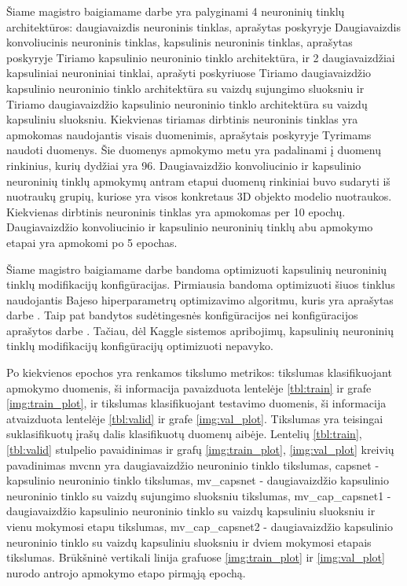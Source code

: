 
Šiame magistro baigiamame darbe yra palyginami 4 neuroninių tinklų architektūros: daugiavaizdis neuroninis tinklas, aprašytas poskyryje Daugiavaizdis konvoliucinis neuroninis tinklas, kapsulinis neuroninis tinklas, aprašytas poskyryje Tiriamo kapsulinio neuroninio tinklo architektūra, ir 2 daugiavaizdžiai kapsuliniai neuroniniai tinklai, aprašyti poskyriuose Tiriamo daugiavaizdžio kapsulinio neuroninio tinklo architektūra su vaizdų sujungimo sluoksniu ir Tiriamo daugiavaizdžio kapsulinio neuroninio tinklo architektūra su vaizdų kapsuliniu sluoksniu. Kiekvienas tiriamas dirbtinis neuroninis tinklas yra apmokomas naudojantis visais duomenimis, aprašytais poskyryje Tyrimams naudoti duomenys. Šie duomenys apmokymo metu yra padalinami į duomenų rinkinius, kurių dydžiai yra 96. Daugiavaizdžio konvoliucinio ir kapsulinio neuroninių tinklų apmokymų antram etapui duomenų rinkiniai buvo sudaryti iš nuotraukų grupių, kuriose yra visos konkretaus 3D objekto modelio nuotraukos. Kiekvienas dirbtinis neuroninis tinklas yra apmokomas per 10 epochų. Daugiavaizdžio konvoliucinio ir kapsulinio neuroninių tinklų abu apmokymo etapai yra apmokomi po 5 epochas.

Šiame magistro baigiamame darbe bandoma optimizuoti kapsulinių neuroninių tinklų modifikacijų konfigūracijas. Pirmiausia bandoma optimizuoti šiuos tinklus naudojantis Bajeso hiperparametrų optimizavimo algoritmu, kuris yra aprašytas darbe \cite{bayes}. Taip pat bandytos sudėtingesnės konfigūracijos nei konfigūracijos aprašytos darbe \cite{capsNet}. Tačiau, dėl Kaggle sistemos apribojimų, kapsulinių neuroninių tinklų modifikacijų konfigūracijų optimizuoti nepavyko.

Po kiekvienos epochos yra renkamos tikslumo metrikos: tikslumas klasifikuojant apmokymo duomenis, ši informacija pavaizduota lentelėje \ref{tbl:train} ir grafe \ref{img:train_plot}, ir tikslumas klasifikuojant testavimo duomenis, ši informacija atvaizduota lentelėje \ref{tbl:valid} ir grafe \ref{img:val_plot}. Tikslumas yra teisingai suklasifikuotų įrašų dalis klasifikuotų duomenų aibėje. Lentelių \ref{tbl:train}, \ref{tbl:valid} stulpelio pavaidinimas ir grafų \ref{img:train_plot}, \ref{img:val_plot} kreivių pavadinimas mvcnn yra daugiavaizdžio neuroninio tinklo tikslumas, capsnet - kapsulinio neuroninio tinklo tikslumas, mv\_capsnet - daugiavaizdžio kapsulinio neuroninio tinklo su vaizdų sujungimo sluoksniu tikslumas, mv\_cap\_capsnet1 - daugiavaizdžio kapsulinio neuroninio tinklo su vaizdų kapsuliniu sluoksniu ir vienu mokymosi etapu tikslumas, mv\_cap\_capsnet2 - daugiavaizdžio kapsulinio neuroninio tinklo su vaizdų kapsuliniu sluoksniu ir dviem mokymosi etapais tikslumas. Brūkšninė vertikali linija grafuose \ref{img:train_plot} ir \ref{img:val_plot} nurodo antrojo apmokymo etapo pirmąją epochą.

